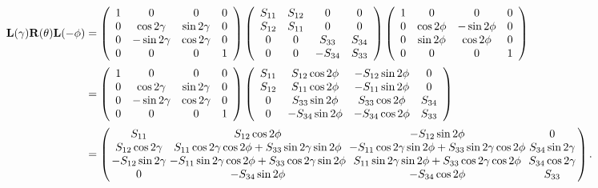 \documentclass[english,a4paper]{my_memo}
\begin{document}
\begin{align*}
\mathbf{L}(\gamma)\mathbf{R}(\theta)\mathbf{L}(-\phi)
& = \left(\begin{array}{cccc}
1 & 0 & 0 & 0\\
0 & \cos2\gamma & \sin2\gamma & 0\\
0 & -\sin2\gamma & \cos2\gamma & 0\\
0 & 0 & 0 & 1
\end{array}\right)
\left(\begin{array}{cccc}
S_{11} & S_{12} & 0 & 0\\
S_{12} & S_{11} & 0 & 0\\
0 & 0 & S_{33} & S_{34}\\
0 & 0 & -S_{34} & S_{33}
\end{array}\right)
\left(\begin{array}{cccc}
1 & 0 & 0 & 0\\
0 & \cos2\phi & -\sin2\phi & 0\\
0 & \sin2\phi & \cos2\phi & 0\\
0 & 0 & 0 & 1
\end{array}\right)\\[2pt]
& = \left(\begin{array}{cccc}
1 & 0 & 0 & 0\\
0 & \cos2\gamma & \sin2\gamma & 0\\
0 & -\sin2\gamma & \cos2\gamma & 0\\
0 & 0 & 0 & 1
\end{array}\right)
\left(\begin{array}{cccc}
S_{11} & S_{12}\cos2\phi & -S_{12}\sin2\phi & 0\\
S_{12} & S_{11}\cos2\phi & -S_{11}\sin2\phi & 0\\
0 & S_{33}\sin2\phi & S_{33}\cos2\phi & S_{34}\\
0 & -S_{34}\sin2\phi & -S_{34}\cos2\phi & S_{33}
\end{array}\right)\\[2pt]
& = {\setlength{\arraycolsep}{1.5pt}\left(\begin{array}{cccc}
S_{11} & S_{12}\cos2\phi & -S_{12}\sin2\phi & 0\\
S_{12}\cos2\gamma & S_{11}\cos2\gamma\cos2\phi+S_{33}\sin2\gamma\sin2\phi & -S_{11}\cos2\gamma\sin2\phi+S_{33}\sin2\gamma\cos2\phi & S_{34}\sin2\gamma\\
-S_{12}\sin2\gamma & -S_{11}\sin2\gamma\cos2\phi+S_{33}\cos2\gamma\sin2\phi & S_{11}\sin2\gamma\sin2\phi+S_{33}\cos2\gamma\cos2\phi & S_{34}\cos2\gamma\\
0 & -S_{34}\sin2\phi & -S_{34}\cos2\phi & S_{33}
\end{array}\right).}
\end{align*}
\end{document}

